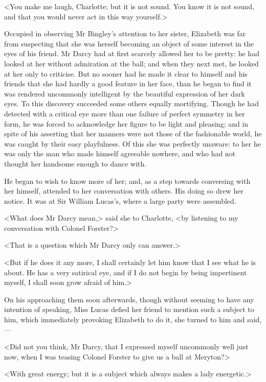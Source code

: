 <You make me laugh, Charlotte; but it is not sound. You know it is not sound, and that you would never act in this way yourself.>

Occupied in observing Mr Bingley's attention to her sister, Elizabeth was far from suspecting that she was herself becoming an object of some interest in the eyes of his friend. Mr Darcy had at first scarcely allowed her to be pretty: he had looked at her without admiration at the ball; and when they next met, he looked at her only to criticise. But no sooner had he made it clear to himself and his friends that she had hardly a good feature in her face, than he began to find it was rendered uncommonly intelligent by the beautiful expression of her dark eyes. To this discovery succeeded some others equally mortifying. Though he had detected with a critical eye more than one failure of perfect symmetry in her form, he was forced to acknowledge her figure to be light and pleasing; and in spite of his asserting that her manners were not those of the fashionable world, he was caught by their easy playfulness. Of this she was perfectly unaware: to her he was only the man who made himself agreeable nowhere, and who had not thought her handsome enough to dance with.

He began to wish to know more of her; and, as a step towards conversing with her himself, attended to her conversation with others. His doing so drew her notice. It was at Sir William Lucas's, where a large party were assembled.

<What does Mr Darcy mean,> said she to Charlotte, <by listening to my conversation with Colonel Forster?>

<That is a question which Mr Darcy only can answer.>

<But if he does it any more, I shall certainly let him know that I see what he is about. He has a very satirical eye, and if I do not begin by being impertinent myself, I shall soon grow afraid of him.>


On his approaching them soon afterwards, though without seeming to have any intention of speaking, Miss Lucas defied her friend to mention such a subject to him, which immediately provoking Elizabeth to do it, she turned to him and said,—

<Did not you think, Mr Darcy, that I expressed myself uncommonly well just now, when I was teasing Colonel Forster to give us a ball at Meryton?>

<With great energy; but it is a subject which always makes a lady energetic.>

